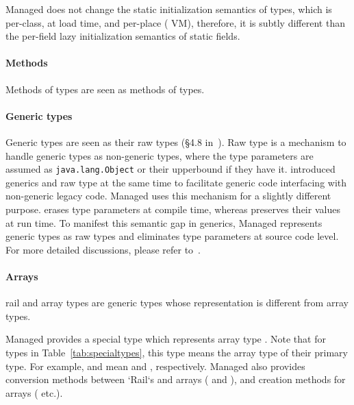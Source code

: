 Managed \Xten{} does not change the static initialization semantics of
\Java{} types, which is per-class, at load time, and per-place (\Java{} VM),
therefore, it is subtly different than the per-field lazy
initialization semantics of \Xten{} static fields.

\paragraph{Methods}

Methods of \Java{} types are seen as methods of \Xten{} types.

\paragraph{Generic types}

Generic \Java{} types are seen as their raw types 
(\S 4.8 in~\cite{java-lang-spec2005}).  Raw type is a mechanism to handle generic
\Java{} types as non-generic types, where the type parameters are assumed
as \verb|java.lang.Object| or their upperbound if they have it.  \Java{}
introduced generics and raw type at the same time to facilitate
generic \Java{} code interfacing with non-generic legacy \Java{} code.
Managed \Xten{} uses this mechanism for a slightly different purpose.
\Java{} erases type parameters at compile time, whereas \Xten{} preserves
their values at run time.  To manifest this semantic gap in generics,
Managed \Xten{} represents \Java{} generic types as raw types and eliminates
type parameters at source code level.  For more detailed discussions,
please refer to~\cite{TakeuchiX1011,TakeuchiX1012}.

\paragraph{Arrays}

\Xten{} rail and array types are generic types whose representation is different
from \Java{} array types.

Managed \Xten{} provides a special \Xten{} type
 which represents \Java{} array type
.  Note that for \Xten{} types in Table~\ref{tab:specialtypes},
this type means the \Java{} array type of their primary type.  For
example,  and  mean
 and , respectively.  Managed \Xten{}
also provides conversion methods between \Xten{} \xcd`Rail`s and \Java{}
arrays ( and
),
and creation methods for \Java{} arrays 
(
etc.).

